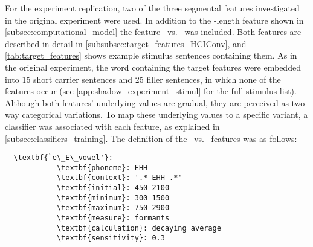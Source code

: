 For the experiment replication, two of the three segmental features investigated in the original experiment were used.
In addition to the -length feature shown in \cref{subsec:computational_model} the feature \textipa{[E:]}~vs.~\textipa{[e:]} was included.
Both features are described in detail in \cref{subsubsec:target_features_HCIConv}, and \cref{tab:target_features} shows example stimulus sentences containing them.
As in the original experiment, the word containing the target features were embedded into 15 short carrier sentences and 25 filler sentences, in which none of the features occur (see \cref{app:shadow_experiment_stimul} for the full stimulus list).
Although both features' underlying values are gradual, they are perceived as two-way categorical variations.
To map these underlying values to a specific variant, a classifier was associated with each feature, as explained in \cref{subsec:classifiers_training}.
The definition of the \textipa{[E:]}~vs.~\textipa{[e:]} features was as follows:
%
%
\begin{Verbatim}[tabsize=4, commandchars=\\\{\}]
	- \textbf{`e\_E\_vowel'}:
			\textbf{phoneme}: EHH
			\textbf{context}: '.* EHH .*'
			\textbf{initial}: 450 2100
			\textbf{minimum}: 300 1500
			\textbf{maximum}: 750 2900
			\textbf{measure}: formants
			\textbf{calculation}: decaying average
			\textbf{sensitivity}: 0.3
\end{Verbatim}
%

